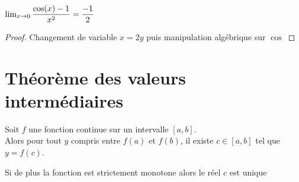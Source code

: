 \documentclass[a4paper, 11pt]{article}
\begin{document}
\begin{prop}
$\lim_{x\rightarrow0} \displaystyle\frac{\cos(x)-1}{x^2}= \frac{-1}{2}$    
\end{prop}
    \begin{proof}
        Changement de variable $x=2y$ puis manipulation algébrique sur $\cos$ 
    \end{proof}
\section{Théorème des valeurs intermédiaires}

\begin{theorem} Soit $f$ une fonction continue sur un intervalle $[a,b]$.\\
Alors pour tout $y$ compris entre $f(a)$ et $f(b)$, il existe $c \in [a,b]$ tel que $y=f(c)$.\vsec

 Si de plus la fonction est strictement monotone alors le réel $c$ est unique
\end{theorem}
\end{document}
